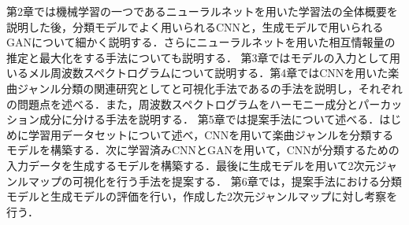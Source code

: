 第2章では機械学習の一つであるニューラルネットを用いた学習法の全体概要を説明した後，分類モデルでよく用いられるCNNと，生成モデルで用いられるGANについて細かく説明する．さらにニューラルネットを用いた相互情報量の推定と最大化をする手法についても説明する．
第3章ではモデルの入力として用いるメル周波数スペクトログラムについて説明する．第4章ではCNNを用いた楽曲ジャンル分類の関連研究として\cite{Mingwen}と可視化手法である\cite{gradcam}の手法を説明し，それぞれの問題点を述べる．また，周波数スペクトログラムをハーモニー成分とパーカッション成分に分ける手法を説明する．
第5章では提案手法について述べる．はじめに学習用データセットについて述べ，CNNを用いて楽曲ジャンルを分類するモデルを構築する．次に学習済みCNNとGANを用いて，CNNが分類するための入力データを生成するモデルを構築する．最後に生成モデルを用いて2次元ジャンルマップの可視化を行う手法を提案する．
第6章では，提案手法における分類モデルと生成モデルの評価を行い，作成した2次元ジャンルマップに対し考察を行う．
